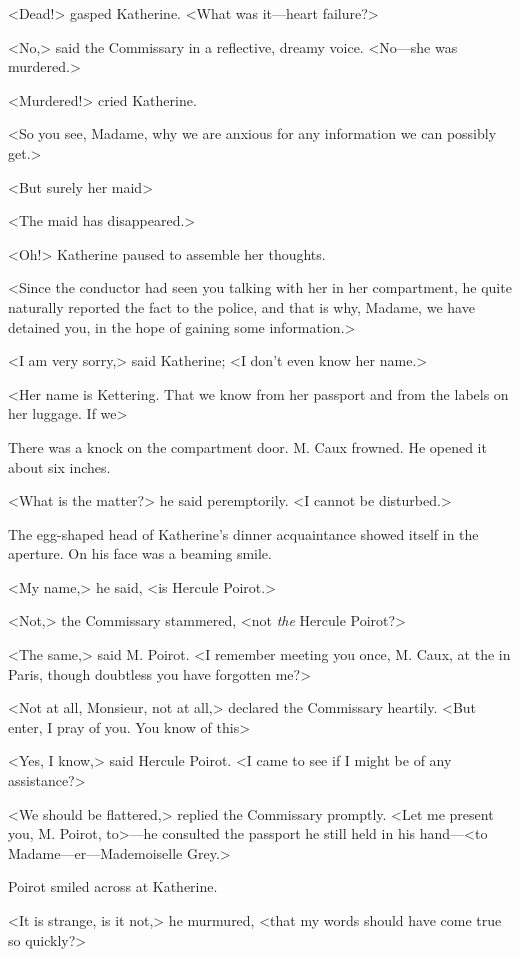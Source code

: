 <Dead!> gasped Katherine. <What was it—heart failure?>

<No,> said the Commissary in a reflective, dreamy voice. <No—she was murdered.>

<Murdered!> cried Katherine.

<So you see, Madame, why we are anxious for any information we can possibly get.>

<But surely her maid\longdash>

<The maid has disappeared.>

<Oh!> Katherine paused to assemble her thoughts.

<Since the conductor had seen you talking with her in her compartment, he quite naturally reported the fact to the police, and that is why, Madame, we have detained you, in the hope of gaining some information.>

<I am very sorry,> said Katherine; <I don't even know her name.>

<Her name is Kettering. That we know from her passport and from the labels on her luggage. If we\longdash>

There was a knock on the compartment door. M. Caux frowned. He opened it about six inches.

<What is the matter?> he said peremptorily. <I cannot be disturbed.>

The egg-shaped head of Katherine's dinner acquaintance showed itself in the aperture. On his face was a beaming smile.

<My name,> he said, <is Hercule Poirot.>

<Not,> the Commissary stammered, <not \emph{the} Hercule Poirot?>

<The same,> said M. Poirot. <I remember meeting you once, M. Caux, at the  in Paris, though doubtless you have forgotten me?>

<Not at all, Monsieur, not at all,> declared the Commissary heartily. <But enter, I pray of you. You know of this\longdash>

<Yes, I know,> said Hercule Poirot. <I came to see if I might be of any assistance?>

<We should be flattered,> replied the Commissary promptly. <Let me present you, M. Poirot, to>—he consulted the passport he still held in his hand—<to Madame—er—Mademoiselle Grey.>

Poirot smiled across at Katherine.

<It is strange, is it not,> he murmured, <that my words should have come true so quickly?>

